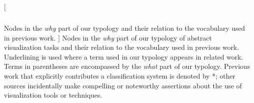 \begin{table}
\begin{center}
\begin{tabular}{p{}>{\RaggedRight}p{}}
    \end{tabular}
    
    \caption
    [
        Nodes in the \textsl{why} part of our typology and their relation to the vocabulary used in previous work.
    ]
    {
        Nodes in the \textsl{why} part of our typology of abstract visualization tasks and their relation to the vocabulary used in previous work.
        Underlining is used where a term used in our typology appears in related work.
        Terms in parentheses are encompassed by the \textsl{what} part of our typology.
        Previous work that explicitly contributes a classification system is denoted by *; other sources incidentally make compelling or noteworthy assertions about the use of visualization tools or techniques.
    }
    
    \label{typology:tab:rw:why}
    \end{center}
\end{table}


    	
